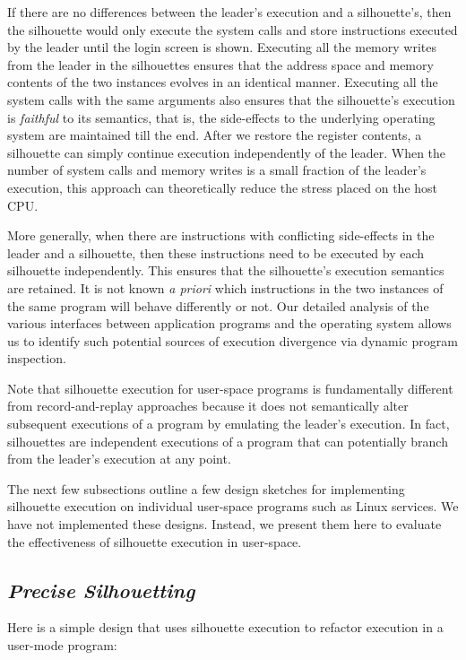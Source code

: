 If there are no differences between the leader's
execution and a silhouette's, then the silhouette would only
execute the system calls and store instructions
executed by the leader until the login screen is shown.
Executing all the memory writes from the leader
in the silhouettes ensures that the address space and memory
contents of the two instances
evolves in an identical manner. Executing all the system
calls with the same arguments also ensures
that the silhouette's execution is {\em faithful}
to its semantics, that is, the side-effects to the underlying
operating system are maintained till the end.
After we restore the register contents, a silhouette can simply continue
execution independently of the leader.
When the number of system calls and memory writes
is a small fraction of the leader's execution,
this approach can theoretically reduce the stress
placed on the host CPU. 

More generally, when there are instructions
with conflicting side-effects in the leader
and a silhouette, then these instructions
need to be executed by each silhouette independently.
This ensures that the silhouette's execution
semantics are retained. 
It is not known {\em a priori} which instructions in the
two instances of the same program will behave
differently or not.
Our detailed analysis of the various interfaces
between application programs and the operating system
allows us to identify such potential sources of
execution divergence via dynamic 
program inspection.

\newpage
Note that silhouette execution for user-space programs is fundamentally different
from record-and-replay approaches because it
does not semantically alter subsequent executions
of a program by emulating the leader's execution. 
In fact, silhouettes are independent executions of a program
that can potentially branch from the leader's execution at any point.

The next few subsections outline a few
design sketches for implementing silhouette execution
on individual user-space programs
such as Linux services.
We have not implemented these designs.
Instead, we present them here 
to evaluate the effectiveness of silhouette
execution in user-space.

\subsection{{\em Precise Silhouetting}}\label{precise:sil}
Here is a simple design that uses silhouette execution 
to refactor execution in a user-mode program:

